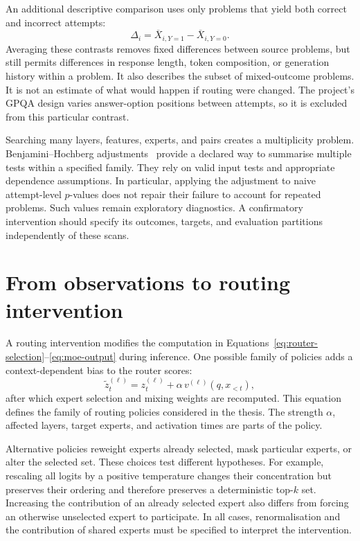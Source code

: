 \documentclass[12pt,a4paper,twoside,openright]{book}
\begin{document}
An additional descriptive comparison uses only problems that yield both
correct and incorrect attempts:
\begin{equation}
  \Delta_i = \overline X_{i,Y=1}-\overline X_{i,Y=0}.
  \label{eq:within-problem}
\end{equation}
Averaging these contrasts removes fixed differences between source problems,
but still permits differences in response length, token composition, or
generation history within a problem. It also describes the subset of
mixed-outcome problems. It is not an estimate of what would happen if routing
were changed. The project's GPQA design varies answer-option positions
between attempts, so it is excluded from this particular contrast.

Searching many layers, features, experts, and pairs creates a multiplicity
problem. Benjamini--Hochberg adjustments~\cite{benjamini1995fdr} provide a
declared way to summarise multiple tests within a specified family.
They rely on valid input tests and appropriate dependence assumptions. In
particular, applying the adjustment to naive attempt-level $p$-values does
not repair their failure to account for repeated problems. Such values
remain exploratory diagnostics. A confirmatory intervention should specify
its outcomes, targets, and evaluation partitions independently of these scans.

\section{From observations to routing intervention}
\label{sec:intervention-framework}

A routing intervention modifies the computation in
Equations~\ref{eq:router-selection}--\ref{eq:moe-output} during inference.
One possible family of policies adds a context-dependent bias to the router
scores:
\begin{equation}
  \widetilde z_t^{(\ell)} = z_t^{(\ell)}
  +\alpha\,v^{(\ell)}(q,x_{<t}),
  \label{eq:routing-intervention}
\end{equation}
after which expert selection and mixing weights are recomputed.
This equation defines the family of routing policies considered in the
thesis. The strength $\alpha$, affected layers,
target experts, and activation times are parts of the policy.

Alternative policies reweight experts already selected, mask particular
experts, or alter the selected set. These choices test different hypotheses.
For example, rescaling all logits by a positive temperature changes their
concentration but preserves their ordering and therefore preserves a
deterministic top-$k$ set. Increasing the contribution of an already selected
expert also differs from forcing an otherwise unselected expert to participate.
In all cases, renormalisation and the contribution of shared experts must be
specified to interpret the intervention.
\end{document}
